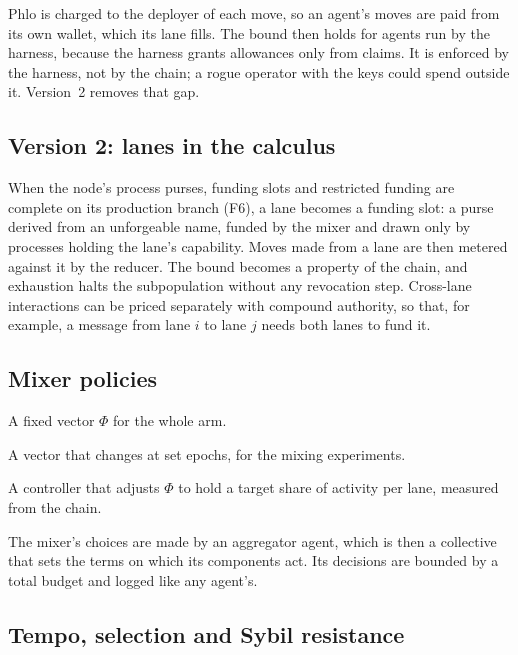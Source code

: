 \documentclass[11pt,a4paper]{article}
\begin{document}
Phlo is charged to the deployer of each move, so an agent's moves are paid from its own wallet,
which its lane fills. The bound then holds for agents run by the harness, because the harness grants
allowances only from claims. It is enforced by the harness, not by the chain; a rogue operator with
the keys could spend outside it. Version~2 removes that gap.

\subsection{Version 2: lanes in the calculus}

When the node's process purses, funding slots and restricted funding are complete on its production
branch (F6), a lane becomes a funding slot: a purse derived from an unforgeable name, funded by the
mixer and drawn only by processes holding the lane's capability. Moves made from a lane are then
metered against it by the reducer. The bound becomes a property of the chain, and exhaustion halts
the subpopulation without any revocation step. Cross-lane interactions can be priced separately with
compound authority, so that, for example, a message from lane $i$ to lane $j$ needs both lanes to
fund it.

\subsection{Mixer policies}

\begin{description}[leftmargin=1.2em,itemsep=3pt,font=\normalfont\spartansemi]
\item[Static.] A fixed vector $\Phi$ for the whole arm.
\item[Scheduled.] A vector that changes at set epochs, for the mixing experiments.
\item[Target.] A controller that adjusts $\Phi$ to hold a target share of activity per lane,
  measured from the chain.
\item[Delegated.] The mixer's choices are made by an aggregator agent, which is then a collective
  that sets the terms on which its components act. Its decisions are bounded by a total budget and
  logged like any agent's.
\end{description}

\subsection{Tempo, selection and Sybil resistance}
\end{document}
